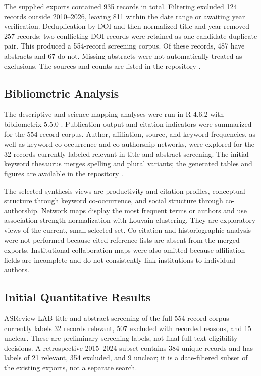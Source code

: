 \documentclass[conference]{IEEEtran}
\begin{document}
The supplied exports contained 935 records in total. Filtering excluded
124 records outside 2010--2026, leaving 811 within the date range or
awaiting year verification. Deduplication by DOI and then normalized title
and year removed 257 records; two conflicting-DOI records were retained as
one candidate duplicate pair. This produced a 554-record screening corpus.
Of these records, 487 have abstracts and 67 do not. Missing abstracts were
not automatically treated as exclusions. The sources and counts are listed
in the repository \cite{repo}.

\subsection{Bibliometric Analysis}

The descriptive and science-mapping analyses were run in R 4.6.2 with
bibliometrix 5.5.0 \cite{aria2017}. Publication output and citation
indicators were summarized for the 554-record corpus. Author, affiliation,
source, and keyword frequencies, as well as keyword co-occurrence and
co-authorship networks, were explored for the 32 records currently labeled
relevant in title-and-abstract screening. The initial keyword thesaurus
merges spelling and plural variants; the generated tables and figures are
available in the repository \cite{repo}.

The selected synthesis views are productivity and citation profiles,
conceptual structure through keyword co-occurrence, and social structure
through co-authorship. Network maps display the most frequent terms or
authors and use association-strength normalization with Louvain clustering.
They are exploratory views of the current, small selected set. Co-citation
and historiographic analysis were not performed because cited-reference
lists are absent from the merged exports. Institutional collaboration maps
were also omitted because affiliation fields are incomplete and do not
consistently link institutions to individual authors.

\subsection{Initial Quantitative Results}

ASReview LAB title-and-abstract screening of the full 554-record corpus
currently labels 32 records relevant, 507 excluded with recorded reasons,
and 15 unclear. These are preliminary screening labels, not final
full-text eligibility decisions. A retrospective 2015--2024 subset
contains 384 unique records and has labels of 21 relevant, 354 excluded,
and 9 unclear; it is a date-filtered subset of the existing exports, not a
separate search.
\end{document}
